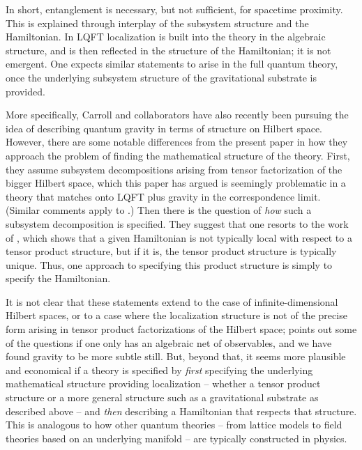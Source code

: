 In short, entanglement is necessary, but not sufficient, for spacetime proximity.  This is explained through interplay of the subsystem structure and the Hamiltonian.  In LQFT localization is built into the theory in the algebraic structure, and is then reflected in the structure of the Hamiltonian; it is not emergent.  One expects similar statements to arise in the full quantum theory, once the underlying subsystem structure of the gravitational substrate is provided.

More specifically, Carroll and collaborators  have also recently been pursuing the idea of describing quantum gravity in terms of structure on Hilbert space.  However, there are some notable differences from the present paper in how they approach the problem of finding the mathematical structure of the theory.  First, they assume subsystem decompositions arising from tensor factorization of the bigger Hilbert space, which this paper has argued is seemingly 
problematic in a theory that matches onto LQFT plus gravity in the correspondence limit. (Similar comments apply to .) Then there is the question of {\it how} such a subsystem decomposition is specified.  They suggest that one resorts to the work of , which shows that a given Hamiltonian is not typically local with respect to a tensor product structure, but if it is, the tensor product structure is typically unique.  Thus, one approach to specifying this product structure is simply to specify the Hamiltonian.  

It is not clear that these statements extend to the case of infinite-dimensional Hilbert spaces, or to a case where the localization structure is not of the precise form arising in tensor product factorizations of the Hilbert space;  points out some of the questions if one only has an algebraic net of observables, and we have found gravity to be more subtle still.  But, beyond that, it seems more plausible and economical if a theory is specified by {\it first} specifying the underlying mathematical structure providing localization -- whether a tensor product structure or a more general structure such as a gravitational substrate as described above -- and {\it then} describing a Hamiltonian that respects that structure.  This is analogous to how other quantum theories -- from lattice models to field theories based on an underlying manifold -- are typically constructed in physics.  

